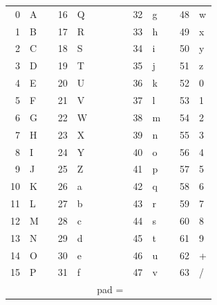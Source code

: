 \begin{table}[h]
\footnotesize\centering
\begin{tabular}{|rlcrlcrlcrl|}
\hline
 {0 }&{A}&{   }&{16 }&{Q}&{   }&{32 }&{g}&{   }&{48 }&{w}\\
 {1 }&{B}&     &{17 }&{R}&     &{33 }&{h}&     &{49 }&{x}\\
 {2 }&{C}&     &{18 }&{S}&     &{34 }&{i}&     &{50 }&{y}\\
 {3 }&{D}&     &{19 }&{T}&     &{35 }&{j}&     &{51 }&{z}\\
 {4 }&{E}&     &{20 }&{U}&     &{36 }&{k}&     &{52 }&{0}\\
 {5 }&{F}&     &{21 }&{V}&     &{37 }&{l}&     &{53 }&{1}\\
 {6 }&{G}&     &{22 }&{W}&     &{38 }&{m}&     &{54 }&{2}\\
 {7 }&{H}&     &{23 }&{X}&     &{39 }&{n}&     &{55 }&{3}\\
 {8 }&{I}&     &{24 }&{Y}&     &{40 }&{o}&     &{56 }&{4}\\
 {9 }&{J}&     &{25 }&{Z}&     &{41 }&{p}&     &{57 }&{5}\\
{10 }&{K}&     &{26 }&{a}&     &{42 }&{q}&     &{58 }&{6}\\
{11 }&{L}&     &{27 }&{b}&     &{43 }&{r}&     &{59 }&{7}\\
{12 }&{M}&     &{28 }&{c}&     &{44 }&{s}&     &{60 }&{8}\\
{13 }&{N}&     &{29 }&{d}&     &{45 }&{t}&     &{61 }&{9}\\
{14 }&{O}&     &{30 }&{e}&     &{46 }&{u}&     &{62 }&{+}\\
{15 }&{P}&     &{31 }&{f}&     &{47 }&{v}&     &{63 }&{/}\\
\hline
&&&&&{pad =}&&&&&\\
\hline
\end{tabular}
\end{table}

